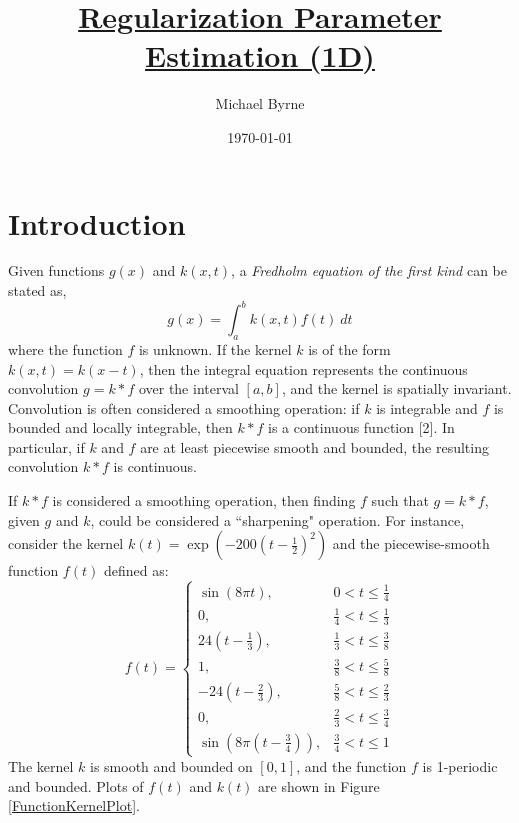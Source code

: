 \documentclass[12pt]{article}
\title{\underline{Regularization Parameter Estimation (1D)}}
\author{Michael Byrne}
\date{\today}
\newcommand{\gcon}{g}
\newcommand{\kcon}{k}
\newcommand{\fcon}{f}
\begin{document}
\maketitle

\section{Introduction}
Given functions $\gcon(x)$ and $\kcon(x,t)$, a \textit{Fredholm equation of the first kind} can be stated as,
\begin{equation}
	\gcon(x) = \int_a^b \kcon(x,t)\fcon(t)\:dt
	\label{Eq_Con}
\end{equation}
where the function $\fcon$ is unknown. If the kernel $\kcon$ is of the form $\kcon(x,t) = \kcon(x-t)$, then the integral equation represents the continuous convolution $\gcon = \kcon * \fcon$ over the interval $[a,b]$, and the kernel is spatially invariant. Convolution is often considered a smoothing operation: if $\kcon$ is integrable and $\fcon$ is bounded and locally integrable, then $\kcon * \fcon$ is a continuous function [2]. In particular, if $\kcon$ and $\fcon$ are at least piecewise smooth and bounded, the resulting convolution $\kcon * \fcon$ is continuous. \par
If $\kcon * \fcon$ is considered a smoothing operation, then finding $\fcon$ such that $\gcon = \kcon * \fcon$, given $\gcon$ and $\kcon$, could be considered a ``sharpening" operation. For instance, consider the kernel $\kcon(t) = \exp(-200(t-\frac{1}{2})^2)$ and the piecewise-smooth function $\fcon(t)$ defined as:
\begin{equation}
\fcon(t) = \begin{cases}
\sin\left(8\pi{t}\right), & 0 < t \leq \frac{1}{4} \\
0, & \frac{1}{4} < t \leq \frac{1}{3} \\
24\left(t-\frac{1}{3}\right), & \frac{1}{3} < t \leq \frac{3}{8} \\
1, & \frac{3}{8} < t \leq \frac{5}{8} \\
-24\left(t-\frac{2}{3}\right), & \frac{5}{8} < t \leq \frac{2}{3} \\
0, & \frac{2}{3} < t \leq \frac{3}{4} \\
\sin\left(8\pi\left(t-\frac{3}{4}\right)\right), & \frac{3}{4} < t \leq 1
\end{cases}
\label{Eq_TF2}
\end{equation}
The kernel $\kcon$ is smooth and bounded on $[0,1]$, and the function $\fcon$ is 1-periodic and bounded. Plots of $\fcon(t)$ and $\kcon(t)$ are shown in Figure \ref{FunctionKernelPlot}. \par
\end{document}

